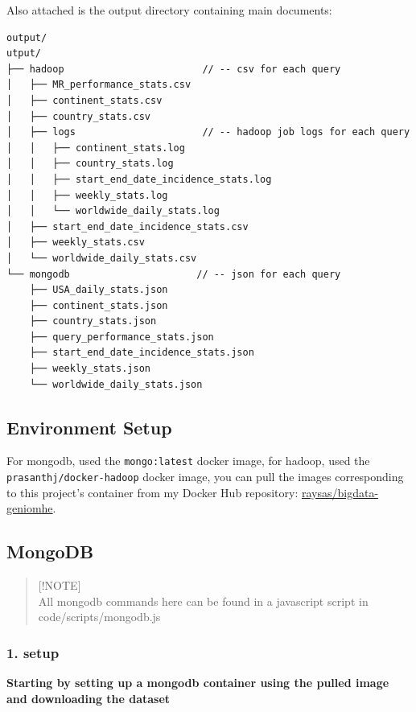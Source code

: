 \documentclass[
]{article}
\begin{document}
Also attached is the output directory containing main documents:

\begin{verbatim}
output/
utput/
├── hadoop                        // -- csv for each query
│   ├── MR_performance_stats.csv
│   ├── continent_stats.csv
│   ├── country_stats.csv
│   ├── logs                      // -- hadoop job logs for each query
│   │   ├── continent_stats.log
│   │   ├── country_stats.log
│   │   ├── start_end_date_incidence_stats.log
│   │   ├── weekly_stats.log
│   │   └── worldwide_daily_stats.log
│   ├── start_end_date_incidence_stats.csv
│   ├── weekly_stats.csv
│   └── worldwide_daily_stats.csv
└── mongodb                      // -- json for each query              
    ├── USA_daily_stats.json
    ├── continent_stats.json
    ├── country_stats.json
    ├── query_performance_stats.json
    ├── start_end_date_incidence_stats.json
    ├── weekly_stats.json
    └── worldwide_daily_stats.json
\end{verbatim}

\hypertarget{environment-setup}{%
\subsection{Environment Setup}\label{environment-setup}}

For mongodb, used the \texttt{mongo:latest} docker image, for hadoop,
used the \texttt{prasanthj/docker-hadoop} docker image, you can pull the
images corresponding to this project's container from my Docker Hub
repository:
\href{https://hub.docker.com/u/raysas}{raysas/bigdata-geniomhe}.

\hypertarget{mongodb}{%
\subsection{MongoDB}\label{mongodb}}

\begin{quote}
{[}!NOTE{]}\\
All mongodb commands here can be found in a javascript script in
code/scripts/mongodb.js
\end{quote}

\hypertarget{setup}{%
\subsubsection{1. setup}\label{setup}}

\textbf{Starting by setting up a mongodb container using the pulled
image and downloading the dataset}
\end{document}
